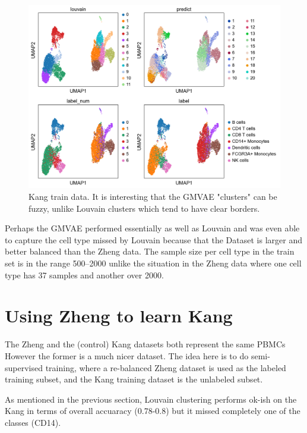 \documentclass[11pt, a4paper]{report}
\theoremstyle{plain}
\theoremstyle{definition}
\theoremstyle{remark}
\begin{document}
\begin{figure}[h]
\centering
\includegraphics[width=1.1\textwidth]{images/gmmvae_Kang_control_train_us_21c_umap.png}
\caption{
Kang train data. It is interesting that the GMVAE "clusters" can be fuzzy,
unlike Louvain clusters which tend to have clear borders.
}
\label{fig:kang_control_train_gmvae_us_umap}
\end{figure}

Perhaps the GMVAE performed essentially as well as Louvain and was even able to
capture the cell type missed by Louvain because that the Dataset is larger and
better balanced than the Zheng data.
The sample size per cell type in the train set is in the range 500--2000 unlike
the situation in the Zheng data where one cell type has 37 samples and another
over 2000.

\section{Using Zheng to learn Kang}

The Zheng and the (control) Kang datasets both represent the same PBMCs
However the former is a much nicer dataset.
The idea here is to do semi-supervised training, where a re-balanced Zheng
dataset is used as the labeled training subset, and the Kang training dataset is the
unlabeled subset.

As mentioned in the previous section, Louvain clustering performs ok-ish on the
Kang in terms of overall accuaracy (0.78-0.8) but it missed completely
one of the classes (CD14).
\end{document}
